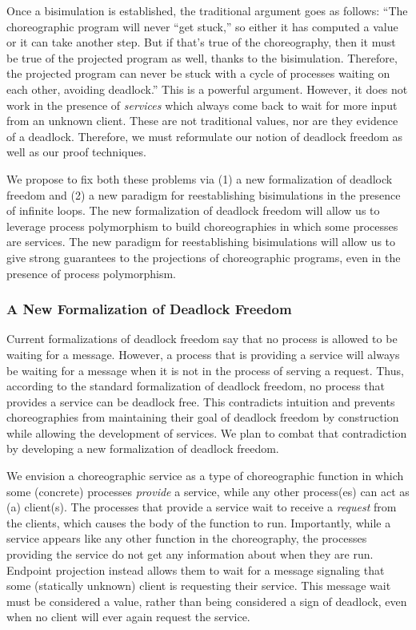 Once a bisimulation is established, the traditional argument goes as follows:
``The choreographic program will never ``get stuck,'' so either it has computed a value or it can take another step.
But if that's true of the choreography, then it must be true of the projected program as well, thanks to the bisimulation.
Therefore, the projected program can never be stuck with a cycle of processes waiting on each other, avoiding deadlock.''
This is a powerful argument.
However, it does not work in the presence of \emph{services} which always come back to wait for more input from an unknown client.
These are not traditional values, nor are they evidence of a deadlock.
Therefore, we must reformulate our notion of deadlock freedom as well as our proof techniques.

We propose to fix both these problems via (1) a new formalization of deadlock freedom and (2) a new paradigm for reestablishing bisimulations in the presence of infinite loops.
The new formalization of deadlock freedom will allow us to leverage process polymorphism to build choreographies in which some processes are services.
The new paradigm for reestablishing bisimulations will allow us to give strong guarantees to the projections of choreographic programs, even in the presence of process polymorphism.

\subsubsection{A New Formalization of Deadlock Freedom}
\label{sec:new-form-deadl}

Current formalizations of deadlock freedom say that no process is allowed to be waiting for a message.
However, a process that is providing a service will always be waiting for a message when it is not in the process of serving a request.
Thus, according to the standard formalization of deadlock freedom, no process that provides a service can be deadlock free.
This contradicts intuition and prevents choreographies from maintaining their goal of deadlock freedom by construction while allowing the development of services.
We plan to combat that contradiction by developing a new formalization of deadlock freedom.

We envision a choreographic service as a type of choreographic function in which some (concrete) processes \emph{provide} a service, while any other process(es) can act as (a) client(s).
The processes that provide a service wait to receive a \emph{request} from the clients, which causes the body of the function to run.
Importantly, while a service appears like any other function in the choreography, the processes providing the service do not get any information about when they are run.
Endpoint projection instead allows them to wait for a message signaling that some (statically unknown) client is requesting their service.
This message wait must be considered a value, rather than being considered a sign of deadlock, even when no client will ever again request the service.


